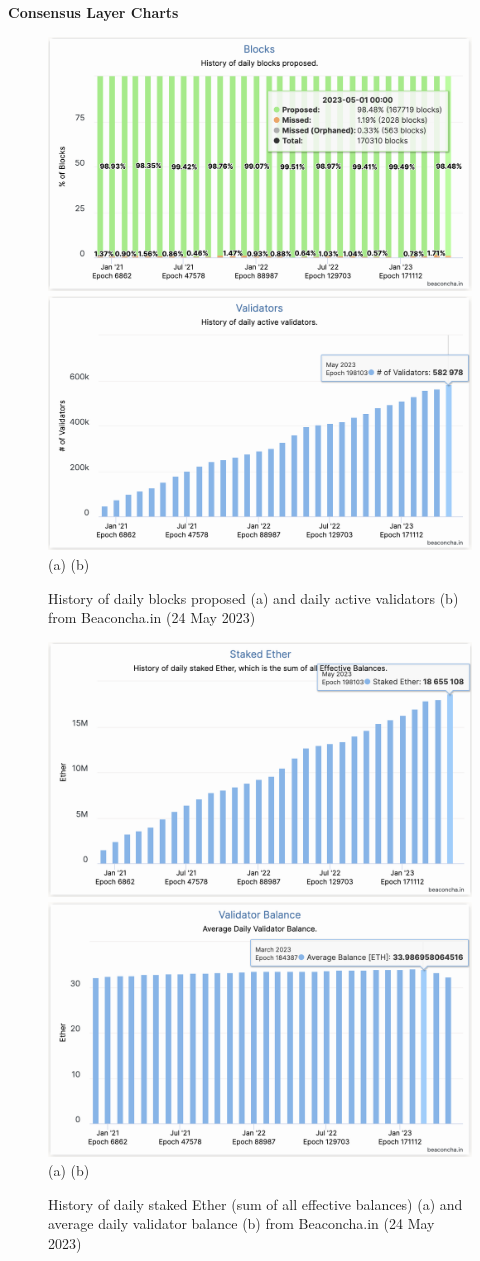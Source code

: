 \documentclass[UTF8]{article}
\begin{document}
\clearpage
\textbf{Consensus Layer Charts}\\
\begin{figure}[htbp]
\begin{center}
\includegraphics[width=0.48\linewidth]{images/bchart1}
\includegraphics[width=0.48\linewidth]{images/bchart2} \\
(a)\hspace{160pt}        (b)\\
\caption{History of daily blocks proposed (a) and daily active validators (b) from Beaconcha.in (24 May 2023)}
\label{fig:chart1}
\end{center}
\end{figure}

\begin{figure}[htbp]
\begin{center}
\includegraphics[width=0.48\linewidth]{images/bchart3}
\includegraphics[width=0.48\linewidth]{images/bchart4} \\
(a)\hspace{160pt}        (b)\\
\caption{History of daily staked Ether (sum of all effective balances) (a) and average daily validator balance (b) from Beaconcha.in (24 May 2023)}
\label{fig:chart3}
\end{center}
\end{figure}
\end{document}

